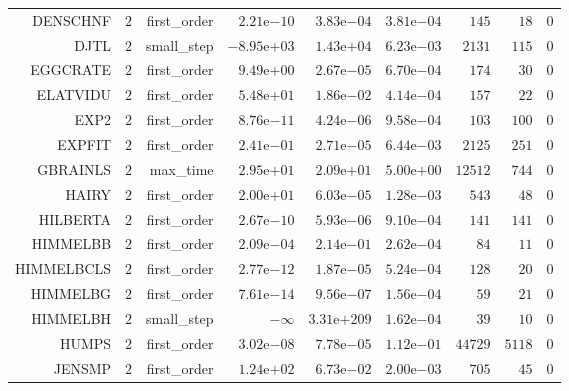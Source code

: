 \begin{longtable}{rrrrrrrrr}
DENSCHNF & \(     2\) & first\_order & \( 2.21\)e\(-10\) & \( 3.83\)e\(-04\) & \( 3.81\)e\(-04\) & \(   145\) & \(    18\) & \(     0\) \\
DJTL & \(     2\) & small\_step & \(-8.95\)e\(+03\) & \( 1.43\)e\(+04\) & \( 6.23\)e\(-03\) & \(  2131\) & \(   115\) & \(     0\) \\
EGGCRATE & \(     2\) & first\_order & \( 9.49\)e\(+00\) & \( 2.67\)e\(-05\) & \( 6.70\)e\(-04\) & \(   174\) & \(    30\) & \(     0\) \\
ELATVIDU & \(     2\) & first\_order & \( 5.48\)e\(+01\) & \( 1.86\)e\(-02\) & \( 4.14\)e\(-04\) & \(   157\) & \(    22\) & \(     0\) \\
EXP2 & \(     2\) & first\_order & \( 8.76\)e\(-11\) & \( 4.24\)e\(-06\) & \( 9.58\)e\(-04\) & \(   103\) & \(   100\) & \(     0\) \\
EXPFIT & \(     2\) & first\_order & \( 2.41\)e\(-01\) & \( 2.71\)e\(-05\) & \( 6.44\)e\(-03\) & \(  2125\) & \(   251\) & \(     0\) \\
GBRAINLS & \(     2\) & max\_time & \( 2.95\)e\(+01\) & \( 2.09\)e\(+01\) & \( 5.00\)e\(+00\) & \( 12512\) & \(   744\) & \(     0\) \\
HAIRY & \(     2\) & first\_order & \( 2.00\)e\(+01\) & \( 6.03\)e\(-05\) & \( 1.28\)e\(-03\) & \(   543\) & \(    48\) & \(     0\) \\
HILBERTA & \(     2\) & first\_order & \( 2.67\)e\(-10\) & \( 5.93\)e\(-06\) & \( 9.10\)e\(-04\) & \(   141\) & \(   141\) & \(     0\) \\
HIMMELBB & \(     2\) & first\_order & \( 2.09\)e\(-04\) & \( 2.14\)e\(-01\) & \( 2.62\)e\(-04\) & \(    84\) & \(    11\) & \(     0\) \\
HIMMELBCLS & \(     2\) & first\_order & \( 2.77\)e\(-12\) & \( 1.87\)e\(-05\) & \( 5.24\)e\(-04\) & \(   128\) & \(    20\) & \(     0\) \\
HIMMELBG & \(     2\) & first\_order & \( 7.61\)e\(-14\) & \( 9.56\)e\(-07\) & \( 1.56\)e\(-04\) & \(    59\) & \(    21\) & \(     0\) \\
HIMMELBH & \(     2\) & small\_step & \(-\infty\) & \(3.31\)e\(+209\) & \( 1.62\)e\(-04\) & \(    39\) & \(    10\) & \(     0\) \\
HUMPS & \(     2\) & first\_order & \( 3.02\)e\(-08\) & \( 7.78\)e\(-05\) & \( 1.12\)e\(-01\) & \( 44729\) & \(  5118\) & \(     0\) \\
JENSMP & \(     2\) & first\_order & \( 1.24\)e\(+02\) & \( 6.73\)e\(-02\) & \( 2.00\)e\(-03\) & \(   705\) & \(    45\) & \(     0\) \\

\end{longtable}
